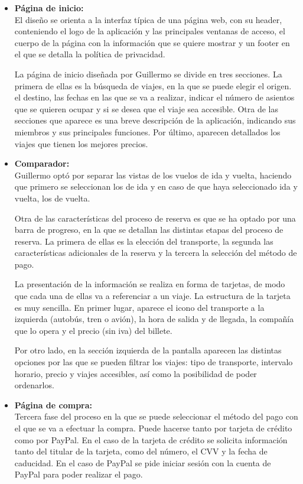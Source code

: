 \begin{itemize}
      \item\textbf{Página de inicio:} \\ El diseño se orienta a la interfaz típica de una página web, con su header, conteniendo el logo de la aplicación y las principales ventanas de acceso, el cuerpo de la página con la información que se quiere mostrar y un footer en el que se detalla la política de privacidad.

            La página de inicio diseñada por Guillermo se divide en tres secciones. La
            primera de ellas es la búsqueda de viajes, en la que se puede elegir el origen.
            el destino, las fechas en las que se va a realizar, indicar el número de
            asientos que se quieren ocupar y si se desea que el viaje sea accesible. Otra
            de las secciones que aparece es una breve descripción de la aplicación,
            indicando sus miembros y sus principales funciones. Por último, aparecen
            detallados los viajes que tienen los mejores precios.

      \item\textbf{Comparador:} \\ Guillermo optó por separar las vistas de los vuelos de ida y vuelta, haciendo que primero se seleccionan los de ida y en caso de que haya seleccionado ida y vuelta, los de vuelta.

            Otra de las características del proceso de reserva es que se ha optado por una
            barra de progreso, en la que se detallan las distintas etapas del proceso de
            reserva. La primera de ellas es la elección del transporte, la segunda las
            características adicionales de la reserva y la tercera la selección del método
            de pago.

            La presentación de la información se realiza en forma de tarjetas, de modo que
            cada una de ellas va a referenciar a un viaje. La estructura de la tarjeta es
            muy sencilla. En primer lugar, aparece el icono del transporte a la izquierda
            (autobús, tren o avión), la hora de salida y de llegada, la compañía que lo
            opera y el precio (sin iva) del billete.

            Por otro lado, en la sección izquierda de la pantalla aparecen las distintas
            opciones por las que se pueden filtrar los viajes: tipo de transporte,
            intervalo horario, precio y viajes accesibles, así como la posibilidad de poder
            ordenarlos. \item\textbf{Página de compra:} \\ Tercera fase del proceso en la
            que se puede seleccionar el método del pago con el que se va a efectuar la
            compra. Puede hacerse tanto por tarjeta de crédito como por PayPal. En el caso
            de la tarjeta de crédito se solicita información tanto del titular de la
            tarjeta, como del número, el CVV y la fecha de caducidad. En el caso de PayPal
            se pide iniciar sesión con la cuenta de PayPal para poder realizar el pago.


\end{itemize}
